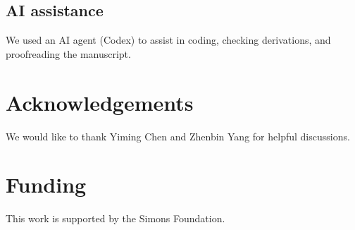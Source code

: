 \documentclass[pdflatex,sn-nature]{sn-jnl}
\begin{document}
\subsection{AI assistance}
We used an AI agent (Codex) to assist in coding, checking derivations, and proofreading the manuscript.

\section*{Acknowledgements}
We would like to thank Yiming Chen and Zhenbin Yang for helpful discussions.

\section*{Funding}
This work is supported by the Simons Foundation.
\end{document}
